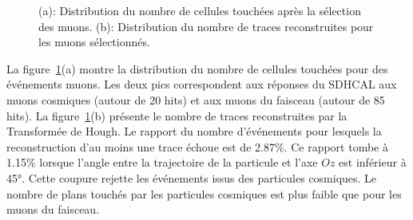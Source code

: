 \begin{figure}[!ht]
  \centering
  \caption{(a): Distribution du nombre de cellules touchées après la sélection des muons. (b): Distribution du nombre de traces reconstruites pour les muons sélectionnés.\label{fig.ntrack_mu-_dat}}
\end{figure}
La figure~\ref{fig.ntrack_mu-_dat}(a) montre la distribution du nombre de cellules touchées pour des événements muons. Les deux pics correspondent aux réponses du SDHCAL aux muons cosmiques (autour de 20 hits) et aux muons du faisceau (autour de 85 hits). La figure~\ref{fig.ntrack_mu-_dat}(b) présente le nombre de traces reconstruites par la Transformée de Hough. Le rapport du nombre d'événements pour lesquels la reconstruction d'au moins une trace échoue est de 2.87$\%$. Ce rapport tombe à 1.15$\%$ lorsque l'angle entre la trajectoire de la particule et l'axe $Oz$ est inférieur à 45°. Cette coupure rejette les événements issus des particules cosmiques. Le nombre de plans touchés par les particules cosmiques est plus faible que pour les muons du faisceau. 

